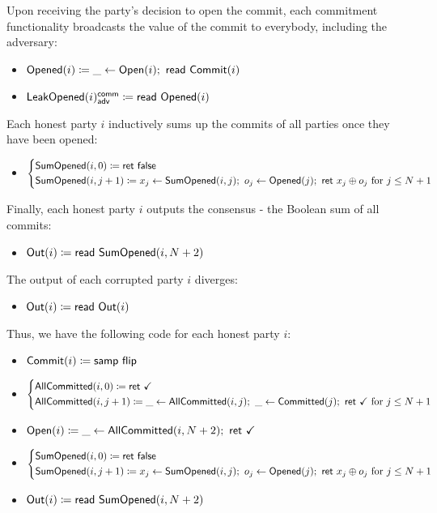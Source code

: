 Upon receiving the party's decision to open the commit, each commitment functionality broadcasts the value of the commit to everybody, including the adversary:
\begin{itemize}
\item {\color{red} $\mathsf{Opened}(i) \coloneqq \_ \leftarrow \mathsf{Open}(i); \ \mathsf{read} \ \mathsf{Commit}(i)$}
\item {\color{red} $\mathsf{LeakOpened}(i)^{\mathsf{comm}}_{\mathsf{adv}} \coloneqq \mathsf{read} \ \mathsf{Opened}(i)$}
\end{itemize}
Each honest party $i$ inductively sums up the commits of all parties once they have been opened:
\begin{itemize}
\item {\color{red} $\begin{cases*} \SumOpened(i,0) \coloneqq \ret{\false} \\ \SumOpened(i,j+1) \coloneqq x_j \leftarrow \SumOpened(i,j); \ o_j \leftarrow \Opened(j); \ \ret{x_j \oplus o_j} \text{ for $j \leq N+1$} \end{cases*}$}
\end{itemize}
Finally, each honest party $i$ outputs the consensus - the Boolean sum of all commits:
\begin{itemize}
\item $\mathsf{Out}(i) \coloneqq \mathsf{read} \ \mathsf{SumOpened}(i,N+2)$
\end{itemize}
The output of each corrupted party $i$ diverges:
\begin{itemize}
\item $\mathsf{Out}(i) \coloneqq \mathsf{read} \ \mathsf{Out}(i)$
\end{itemize}
Thus, we have the following code for each honest party $i$:
\begin{itemize}
\item {\color{blue} $\mathsf{Commit}(i) \coloneqq \mathsf{samp} \ \mathsf{flip}$}
\item {\color{magenta} $\begin{cases*} \AllCommitted(i,0) \coloneqq \ret{\checkmark} \\ \AllCommitted(i,j+1) \coloneqq \_ \leftarrow \AllCommitted(i,j); \ \_ \leftarrow \Committed(j); \ \ret{\checkmark} \text{ for $j \leq N+1$} \end{cases*}$}
\item {\color{teal} $\Open(i) \coloneqq \_ \leftarrow \AllCommitted(i,N+2); \ \ret{\checkmark}$}
\item {\color{red} $\begin{cases*} \SumOpened(i,0) \coloneqq \ret{\false} \\ \SumOpened(i,j+1) \coloneqq x_j \leftarrow \SumOpened(i,j); \ o_j \leftarrow \Opened(j); \ \ret{x_j \oplus o_j} \text{ for $j \leq N+1$} \end{cases*}$}
\item $\mathsf{Out}(i) \coloneqq \mathsf{read} \ \mathsf{SumOpened}(i,N+2)$
\end{itemize}

